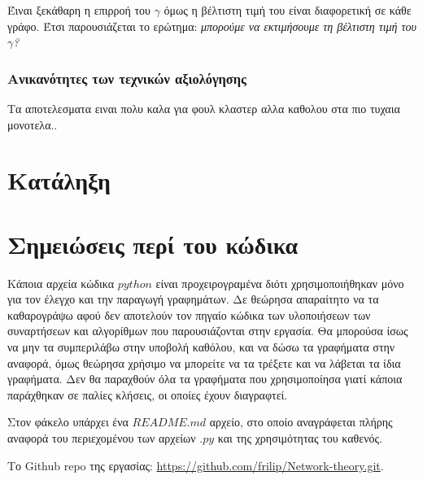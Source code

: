 \documentclass[12pt, letterpaper]{article}
\newcommand{\en}{\selectlanguage{english}}
\newcommand{\gr}{\selectlanguage{greek}}
\begin{document}
Έιναι ξεκάθαρη η επιρροή του $\gamma$ όμως η βέλτιστη τιμή του είναι διαφορετική 
σε κάθε γράφο. Έτσι παρουσιάζεται το ερώτημα: \emph{μπορούμε να εκτιμήσουμε τη 
βέλτιστη τιμή του $\gamma$?}














\subsubsection{Ανικανότητες των τεχνικών αξιολόγησης}

Τα αποτελεσματα ειναι πολυ καλα για φουλ κλαστερ αλλα καθολου στα πιο τυχαια μονοτελα..


\section{Κατάληξη}


\section{Σημειώσεις περί του κώδικα}

Κάποια αρχεία κώδικα $python$ είναι προχειρογραμένα διότι χρησιμοποιήθηκαν μόνο για τον έλεγχο και την παραγωγή γραφημάτων.
Δε θεώρησα απαραίτητο να τα καθαρογράψω αφού δεν αποτελούν τον πηγαίο κώδικα των υλοποιήσεων των συναρτήσεων και αλγορίθμων 
που παρουσιάζονται στην εργασία. Θα μπορούσα ίσως να μην τα συμπεριλάβω στην υποβολή καθόλου, και να δώσω τα γραφήματα 
στην αναφορά, όμως θεώρησα χρήσιμο να μπορείτε να τα τρέξετε και να λάβεται τα ίδια γραφήματα. Δεν θα παραχθούν όλα 
τα γραφήματα που χρησιμοποίησα γιατί κάποια παράχθηκαν σε παλίες κλήσεις, οι οποίες έχουν διαγραφτεί.

Στον φάκελο υπάρχει ένα $README.md$ αρχείο, στο οποίο αναγράφεται πλήρης αναφορά του περιεχομένου των αρχείων $.py$ 
και της χρησιμότητας του καθενός. 

Το \textlatin{Github repo} της εργασίας: \en \href{https://github.com/frilip/Network-theory.git}{https://github.com/frilip/Network-theory.git}.

\gr

\renewcommand{\refname}{\selectlanguage{greek} Αναφορές}  


\end{document}
